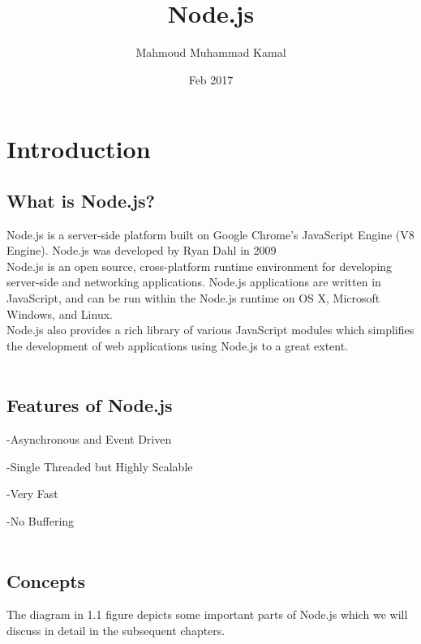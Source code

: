 \documentclass[a4paper,12pt]{book}
\begin{document}
\author{Mahmoud Muhammad Kamal}
\title{Node.js}
\date{Feb 2017}

\frontmatter
\maketitle
\tableofcontents

\mainmatter
\chapter{Introduction}

\section{What is Node.js?}
Node.js is a server-side platform built on Google Chrome's JavaScript Engine (V8 Engine). Node.js was developed by Ryan Dahl in 2009\\

Node.js is an open source, cross-platform runtime environment for developing server-side and networking applications. Node.js applications are written in JavaScript, and can be run within the Node.js runtime on OS X, Microsoft Windows, and Linux.\\

Node.js also provides a rich library of various JavaScript modules which simplifies the development of web applications using Node.js to a great extent.\\ \\
\section{Features of Node.js}
\begin{list}{label}{}
  	\item[-Asynchronous and Event Driven]
  	\item[-Single Threaded but Highly Scalable]
  	\item[-Very Fast]
  	\item[-No Buffering\\ \\]
\end{list}
\section{Concepts}
The diagram in 1.1 figure depicts some important parts of Node.js which we will discuss in detail in the subsequent chapters.
\end{document}
